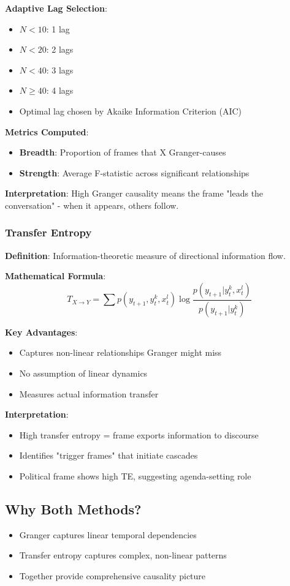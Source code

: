 \documentclass[11pt]{article}
\begin{document}
\textbf{Adaptive Lag Selection}:
\begin{itemize}
    \item $N < 10$: 1 lag
    \item $N < 20$: 2 lags
    \item $N < 40$: 3 lags
    \item $N \geq 40$: 4 lags
    \item Optimal lag chosen by Akaike Information Criterion (AIC)
\end{itemize}

\textbf{Metrics Computed}:
\begin{itemize}
    \item \textbf{Breadth}: Proportion of frames that X Granger-causes
    \item \textbf{Strength}: Average F-statistic across significant relationships
\end{itemize}

\textbf{Interpretation}:
High Granger causality means the frame "leads the conversation" - when it appears, others follow.

\subsubsection{Transfer Entropy}
\textbf{Definition}: Information-theoretic measure of directional information flow.

\textbf{Mathematical Formula}:
$$T_{X \to Y} = \sum p(y_{t+1}, y_t^k, x_t^l) \log \frac{p(y_{t+1}|y_t^k, x_t^l)}{p(y_{t+1}|y_t^k)}$$

\textbf{Key Advantages}:
\begin{itemize}
    \item Captures non-linear relationships Granger might miss
    \item No assumption of linear dynamics
    \item Measures actual information transfer
\end{itemize}

\textbf{Interpretation}:
\begin{itemize}
    \item High transfer entropy = frame exports information to discourse
    \item Identifies "trigger frames" that initiate cascades
    \item Political frame shows high TE, suggesting agenda-setting role
\end{itemize}

\subsection{Why Both Methods?}
\begin{itemize}
    \item Granger captures linear temporal dependencies
    \item Transfer entropy captures complex, non-linear patterns
    \item Together provide comprehensive causality picture
\end{itemize}
\end{document}
